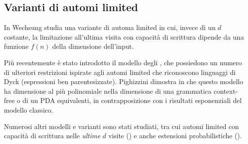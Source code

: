 \subsection{Varianti di automi limited}
In \cite{Wechsung:79:complexities} Wechsung studia una variante di automa limited in cui, invece di un $d$ costante, la limitazione all'ultima visita con capacità di scrittura dipende da una funzione $f(n)$ della dimensione dell'input.

Più recentemente è stato introdotto il modello degli , che possiedono un numero di ulteriori restrizioni ispirate agli automi limited che riconoscono linguaggi di Dyck (espressioni ben parentesizzate). Pighizzini dimostra in \cite{Pighizzini:16:stronglylimited} che questo modello ha dimensione al più polinomiale nella dimensione di una grammatica context-free o di un PDA equivalenti, in contrapposizione con i risultati esponenziali del modello classico.

Numerosi altri modelli e varianti sono stati studiati, tra cui automi limited con capacità di scrittura nelle \emph{ultime} $d$ visite (\cite{Wechsung:79:complexities}) e anche estensioni probabilistiche (\cite{Yamakami:19:limitedmodels}).
